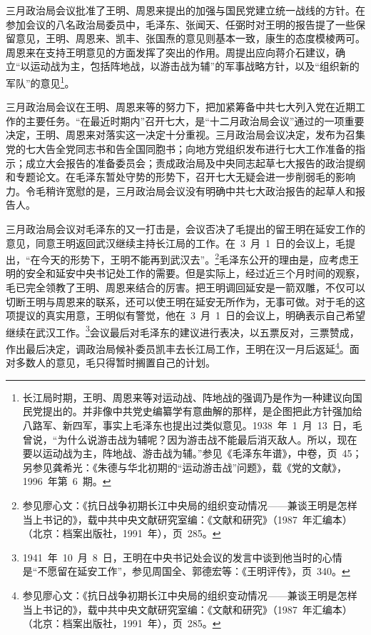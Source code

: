 三月政治局会议批准了王明、周恩来提出的加强与国民党建立统一战线的方针。在参加会议的八名政治局委员中，毛泽东、张闻天、任弼时对王明的报告提了一些保留意见，王明、周恩来、凯丰、张国焘的意见则基本一致，康生的态度模棱两可。周恩来在支持王明意见的方面发挥了突出的作用。周提出应向蒋介石建议，确立“以运动战为主，包括阵地战，以游击战为辅”的军事战略方针，以及“组织新的军队”的意见\footnote{长江局时期，王明、周恩来等对运动战、阵地战的强调乃是作为一种建议向国民党提出的。并非像中共党史编纂学有意曲解的那样，是企图把此方针强加给八路军、新四军，事实上毛泽东也提出过类似意见。1938~年~1~月~13~日，毛曾说，“为什么说游击战为辅呢？因为游击战不能最后消灭敌人。所以，现在要以运动战为主，阵地战、游击战为辅。”参见《毛泽东年谱》，中卷，页~45；另参见龚希光：《朱德与华北初期的“运动游击战”问题》，载《党的文献》，1996~年第~6~期。}。

三月政治局会议在王明、周恩来等的努力下，把加紧筹备中共七大列入党在近期工作的主要任务。“在最近时期内”召开七大，是“十二月政治局会议”通过的一项重要决定，王明、周恩来对落实这一决定十分重视。三月政治局会议决定，发布为召集党的七大告全党同志书和告全国同胞书；向地方党组织发布进行七大工作准备的指示；成立大会报告的准备委员会；责成政治局及中央同志起草七大报告的政治提纲和专题论文。在毛泽东暂处守势的形势下，召开七大无疑会进一步削弱毛的影响力。令毛稍许宽慰的是，三月政治局会议没有明确中共七大政治报告的起草人和报告人。

三月政治局会议对毛泽东的又一打击是，会议否决了毛提出的留王明在延安工作的意见，同意王明返回武汉继续主持长江局的工作。在~3~月~1~日的会议上，毛提出，“在今天的形势下，王明不能再到武汉去”。\footnote{参见廖心文：《抗日战争初期长江中央局的组织变动情况——兼谈王明是怎样当上书记的》，载中共中央文献研究室编：《文献和研究》（1987~年汇编本）（北京：档案出版社，1991~年），页~285。}毛泽东公开的理由是，应考虑王明的安全和延安中央书记处工作的需要。但是实际上，经过近三个月时间的观察，毛已完全领教了王明、周恩来结合的厉害。把王明调回延安是一箭双雕，不仅可以切断王明与周恩来的联系，还可以使王明在延安无所作为，无事可做。对于毛的这项提议的真实用意，王明似有警觉，他在~3~月~1~日的会议上，明确表示自己希望继续在武汉工作。\footnote{1941~年~10~月~8~日，王明在中央书记处会议的发言中谈到他当时的心情是“不愿留在延安工作”，参见周国全、郭德宏等：《王明评传》，页~340。}会议最后对毛泽东的建议进行表决，以五票反对，三票赞成，作出最后决定，调政治局候补委员凯丰去长江局工作，王明在汉一月后返延\footnote{参见廖心文：《抗日战争初期长江中央局的组织变动情况——兼谈王明是怎样当上书记的》，载中共中央文献研究室编：《文献和研究》（1987~年汇编本）（北京：档案出版社，1991~年），页~285。}。面对多数人的意见，毛只得暂时搁置自己的计划。

